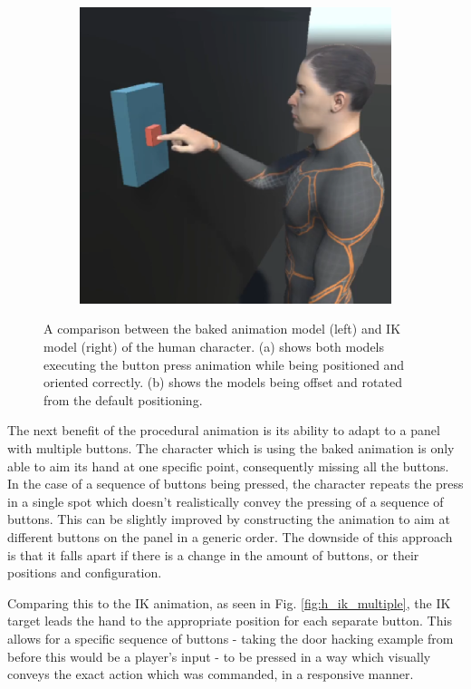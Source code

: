 \begin{figure}
\begin{subfigure}{\textwidth}
        \hspace{0.1cm}
        \includegraphics[width=0.4\linewidth]{grafika/h_ik_offset.eps}
        \subcaption{}
        \label{fig:h_offset}
    \end{subfigure}
    \caption{A comparison between the baked animation model (left) and IK model
    (right) of the human character. (a) shows both models executing the button
    press animation while being positioned and oriented correctly. (b) shows the
    models being offset and rotated from the default positioning.}
    \label{fig:human_comparison}
\end{figure}


The next benefit of the procedural animation is its ability to adapt to a panel
with multiple buttons. The character which is using the baked animation is only
able to aim its hand at one specific point, consequently missing all the
buttons. In the case of a sequence of buttons being pressed, the character
repeats the press in a single spot which doesn't realistically convey the
pressing of a sequence of buttons. This can be slightly improved by constructing
the animation to aim at different buttons on the panel in a generic order. The
downside of this approach is that it falls apart if there is a change in the
amount of buttons, or their positions and configuration. 

Comparing this to the IK animation, as seen in Fig. \ref{fig:h_ik_multiple},
the IK target leads the hand to the appropriate position for each separate
button. This allows for a specific sequence of buttons - taking the door hacking
example from before this would be a player's input - to be pressed in a way
which visually conveys the exact action which was commanded, in a responsive
manner.

